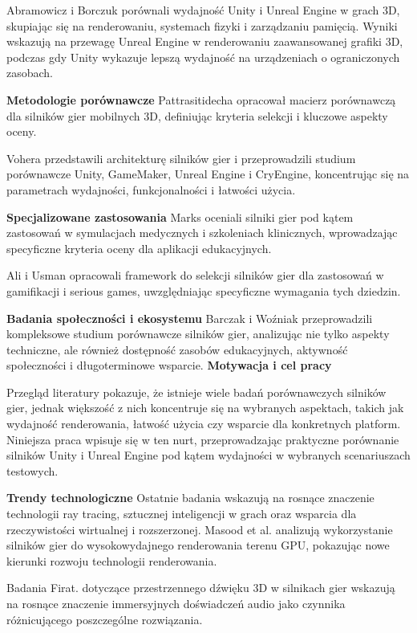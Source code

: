 Abramowicz i Borczuk \cite{abramowicz2024comparative} porównali wydajność Unity i Unreal Engine w grach 3D, skupiając się na renderowaniu, systemach fizyki i zarządzaniu pamięcią. Wyniki wskazują na przewagę Unreal Engine w renderowaniu zaawansowanej grafiki 3D, podczas gdy Unity wykazuje lepszą wydajność na urządzeniach o ograniczonych zasobach.

\textbf{Metodologie porównawcze}
Pattrasitidecha \cite{pattrasitidecha2014comparison} 
opracował macierz porównawczą dla silników gier mobilnych 3D, 
definiując kryteria selekcji i kluczowe aspekty oceny. 

Vohera \cite{vohera2021game} przedstawili architekturę silników gier i przeprowadzili studium porównawcze Unity, GameMaker, Unreal Engine i CryEngine, koncentrując się na parametrach wydajności, funkcjonalności i łatwości użycia.

\textbf{Specjalizowane zastosowania}
Marks \cite{marks2008evaluation} oceniali silniki gier pod kątem zastosowań w symulacjach medycznych i szkoleniach klinicznych, wprowadzając specyficzne kryteria oceny dla aplikacji edukacyjnych.

Ali i Usman \cite{ali2016framework} opracowali framework do selekcji 
silników gier dla zastosowań w gamifikacji i serious games, 
uwzględniając specyficzne wymagania tych dziedzin.

\textbf{Badania społeczności i ekosystemu}
Barczak i Woźniak \cite{barczak2019comparative} przeprowadzili kompleksowe studium porównawcze silników gier, analizując nie tylko aspekty techniczne, ale również dostępność zasobów edukacyjnych, aktywność społeczności i długoterminowe wsparcie.
\newpage
\textbf{Motywacja i cel pracy}

Przegląd literatury pokazuje, że istnieje wiele badań porównawczych
silników gier, jednak większość z nich koncentruje się na wybranych
aspektach, takich jak wydajność renderowania, łatwość użycia czy
wsparcie dla konkretnych platform. Niniejsza praca wpisuje się w ten
nurt, przeprowadzając praktyczne porównanie silników Unity i Unreal
Engine pod kątem wydajności w wybranych scenariuszach testowych.

\textbf{Trendy technologiczne}
Ostatnie badania wskazują na rosnące znaczenie technologii ray tracing,
sztucznej inteligencji w grach oraz wsparcia dla rzeczywistości wirtualnej i rozszerzonej. Masood et al. \cite{masood2022high} analizują wykorzystanie silników gier do wysokowydajnego renderowania terenu GPU, pokazując nowe kierunki rozwoju technologii renderowania.

Badania Firat. \cite{firat2022sound} dotyczące przestrzennego dźwięku 3D w silnikach gier wskazują na rosnące znaczenie immersyjnych doświadczeń audio jako czynnika różnicującego poszczególne rozwiązania.


